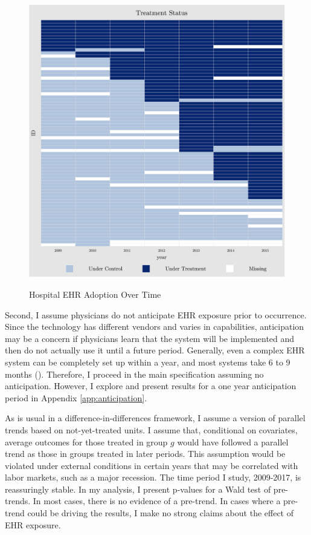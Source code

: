 \documentclass[11pt]{article}
\begin{document}
\begin{figure}[ht]
    \centering
    \captionsetup{width=.7\linewidth}
    \caption{Hospital EHR Adoption Over Time}
    \includegraphics[scale=.7]{Objects/hosp_treat.pdf}
    \label{fig:hosp_treat}
\end{figure}

Second, I assume physicians do not anticipate EHR exposure prior to occurrence. Since the technology has different vendors and varies in capabilities, anticipation may be a concern if physicians learn that the system will be implemented and then do not actually use it until a future period. Generally, even a complex EHR system can be completely set up within a year, and most systems take 6 to 9 months (\cite{uzialko_2021}). Therefore, I proceed in the main specification assuming no anticipation. However, I explore and present results for a one year anticipation period in Appendix \ref{app:anticipation}. 

As is usual in a difference-in-differences framework, I assume a version of parallel trends based on not-yet-treated units. I assume that, conditional on covariates, average outcomes for those treated in group $g$ would have followed a parallel trend as those in groups treated in later periods. This assumption would be violated under external conditions in certain years that may be correlated with labor markets, such as a major recession. The time period I study, 2009-2017, is reassuringly stable. In my analysis, I present p-values for a Wald test of pre-trends. In most cases, there is no evidence of a pre-trend. In cases where a pre-trend could be driving the results, I make no strong claims about the effect of EHR exposure. 
\end{document}
